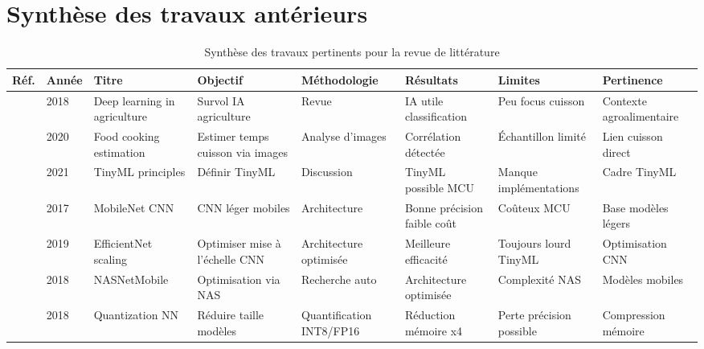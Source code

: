 \section{Synthèse des travaux antérieurs}
\begin{table}[H]
	\centering
	\scriptsize
	\caption{Synthèse des travaux pertinents pour la revue de littérature}
	\label{tab:revue_litterature}
	\begin{tabularx}{\textwidth}{|p{0.5cm}|p{0.7cm}|p{2.0cm}|X|X|X|X|X|}
		\hline
		\textbf{Réf.}                & \textbf{Année} & \textbf{Titre}               & \textbf{Objectif}                & \textbf{Méthodologie}       & \textbf{Résultats}           & \textbf{Limites}                & \textbf{Pertinence}              \\
		\hline
		\cite{kamilaris2018}         & 2018           & Deep learning in agriculture & Survol IA agriculture            & Revue                       & IA utile classification      & Peu focus cuisson               & Contexte agroalimentaire         \\
		\hline
		\cite{rahman2020}            & 2020           & Food cooking estimation      & Estimer temps cuisson via images & Analyse d’images            & Corrélation détectée         & Échantillon limité              & Lien cuisson direct              \\
		\hline
		\cite{banbury2021micronets}  & 2021           & TinyML principles            & Définir TinyML                   & Discussion                  & TinyML possible MCU          & Manque implémentations          & Cadre TinyML                     \\
		\hline
		\cite{howard2017mobilenets}  & 2017           & MobileNet CNN                & CNN léger mobiles                & Architecture                & Bonne précision faible coût  & Coûteux MCU                     & Base modèles légers              \\
		\hline
		\cite{tan2019mnasnet}        & 2019           & EfficientNet scaling         & Optimiser mise à l’échelle CNN   & Architecture optimisée      & Meilleure efficacité         & Toujours lourd TinyML           & Optimisation CNN                 \\
		\hline
		\cite{zoph2018}              & 2018           & NASNetMobile                 & Optimisation via NAS             & Recherche auto              & Architecture optimisée       & Complexité NAS                  & Modèles mobiles                  \\
		\hline
		\cite{jacob2018quantization} & 2018           & Quantization NN              & Réduire taille modèles           & Quantification INT8/FP16    & Réduction mémoire x4         & Perte précision possible        & Compression mémoire              \\

\end{tabularx}
\end{table}
